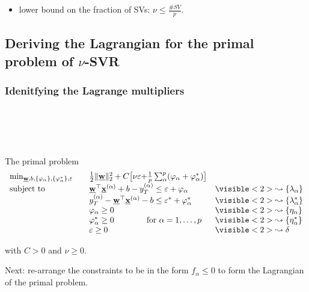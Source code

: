 \begin{frame}
\begin{itemize}
     \item lower bound on the fraction of SVs: $\nu \le \frac{\# SV}{p}$.
     \end{itemize}
\end{frame}


\subsection{Deriving the Lagrangian for the primal problem of $\nu$-SVR}

\subsubsection{Idenitfying the Lagrange multipliers}

\begin{frame}\frametitle{\subsecname\\ \subsubsecname}

\slidesonly{\vspace{-3mm}}

\\

\slidesonly{\vspace{-3mm}}

\begin{block}{The primal problem}
     \begin{equation}
        \begin{array}{lrll}
        \min_{\vec w, b,\{\varphi_\alpha\}, \{\varphi_\alpha^*\}{, {{\varepsilon}}}} && \frac{1}{2} \lVert \vec w \rVert_{2}^{2} + C {\big\lbrack \nu{\varepsilon} + } \frac{1}{p} \sum_{\alpha}^p (\varphi_\alpha + \varphi_\alpha^*) {\big\rbrack}			&\\
        \text{subject to}
        &&\vec w^{\top} \vec x^{(\alpha)} + b - y_{T}^{(\alpha)} \le \varepsilon + \varphi_\alpha		&\visible<2>{\leadsto\{\lambda_{\alpha}\}}\\
        &&y_{T}^{(\alpha)} - \vec w^{\top} \vec x^{(\alpha)} - b \le \varepsilon^* + \varphi_\alpha^*	&\visible<2>{\leadsto\{\lambda_{\alpha}^*\}}\\
        &&\varphi_\alpha \ge 0  												&\visible<2>{\leadsto\{\eta_{\alpha}\}}\\
        &&\varphi_\alpha^* \ge 0 \qquad\qquad \text{for }\alpha=1,\ldots,p 		&\visible<2>{\leadsto\{\eta_{\alpha}^*\}}\\
        &&\varepsilon \ge 0														&\visible<2>{\leadsto\delta}
        \end{array}
     \end{equation}
        
        with $C>0$ and $\nu \ge 0$.
\end{block}

\pause

Next: re-arrange the constraints to be in the form $f_\alpha \le 0$ to form the Lagrangian of the primal problem.

\end{frame}

